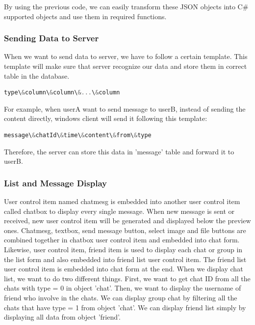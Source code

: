 \documentclass[a4paper,11pt]{article}
\begin{document}
By using the previous code, we can easily transform these JSON objects into C\# supported objects and use them in required functions. 

\subsubsection{Sending Data to Server}

When we want to send data to server, we have to follow a certain template. This template will make sure that server recognize our data and store them in correct table in the database. 

\begin{lstlisting}[language=C]
type\&column\&column\&...\&column
\end{lstlisting}

For example, when userA want to send message to userB, instead of sending the content directly, windows client will send it following this template:

\begin{lstlisting}[language=C]
message\&chatId\&time\&content\&from\&type
\end{lstlisting}

Therefore, the server can store this data in 'message' table and forward it to userB.


\subsubsection{List and Message Display}
User control item named chatmesg is embedded into another user control item called chatbox to display every single message. When new message is sent or received, new user control item will be generated and displayed below the preview ones. Chatmesg, textbox, send message button, select image and file buttons are combined together in chatbox user control item and embedded into chat form. Likewise, user control item, friend item is used to display each chat or group in the list form and also embedded into friend list user control item. The friend list user control item is embedded into chat form at the end.  
When we display chat list, we want to do two different things. First, we want to get chat ID from all the chats with type = 0 in object 'chat'. Then, we want to display the username of friend who involve in the chats.
We can display group chat by filtering all the chats that have type = 1 from object 'chat'.
We can display friend list simply by displaying all data from object 'friend'.
\end{document}

